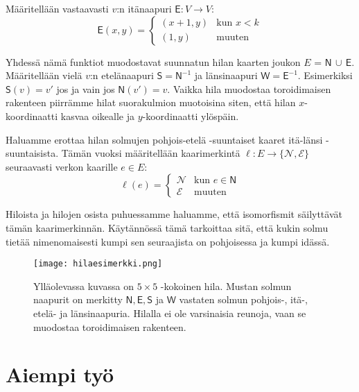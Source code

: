 \documentclass[12pt,finnish]{tktltiki2}
\theoremstyle{definition}
\theoremstyle{remark}
\begin{document}
Määritellään vastaavasti $v$:n itänaapuri $\mathsf{E}: V \rightarrow V$:
\[ \mathsf{E}(x, y) = 
  \begin{cases}
   (x+1, y) & \text{kun } x < k \\
   (1, y) & \text{muuten}
  \end{cases}
\]

Yhdessä nämä funktiot muodostavat suunnatun hilan kaarten joukon $E$ = $\mathsf{N} \, \cup \, \mathsf{E}$. Määritellään vielä $v$:n etelänaapuri $\mathsf{S} = \mathsf{N}^{-1}$ ja länsinaapuri $\mathsf{W} = \mathsf{E}^{-1}$. Esimerkiksi $\mathsf{S}(v) = v'$ jos ja vain jos $\mathsf{N}(v') = v$. Vaikka hila muodostaa toroidimaisen rakenteen piirrämme hilat suorakulmion muotoisina siten, että hilan $x$-koordinaatti kasvaa oikealle ja $y$-koordinaatti ylöspäin.

Haluamme erottaa hilan solmujen pohjois-etelä -suuntaiset kaaret itä-länsi -suuntaisista. Tämän vuoksi määritellään kaarimerkintä $\ell: E \rightarrow \{\mathcal{N}, \mathcal{E}\}$ seuraavasti verkon kaarille $e \in E$:
\[ \ell(e) = 
  \begin{cases}
   \mathcal{N} & \text{kun } e \in \mathsf{N} \\
   \mathcal{E} & \text{muuten}
  \end{cases}
\]

Hiloista ja hilojen osista puhuessamme haluamme, että isomorfismit säilyttävät tämän kaarimerkinnän. Käytännössä tämä tarkoittaa sitä, että kukin solmu tietää nimenomaisesti kumpi sen seuraajista on pohjoisessa ja kumpi idässä.

\begin{figure}
  \centering
  \texttt{[image: hilaesimerkki.png]}
  \caption{Ylläolevassa kuvassa on $5 \times 5$ -kokoinen hila. Mustan solmun naapurit on merkitty $\mathsf{N}, \mathsf{E}, \mathsf{S}$ ja $\mathsf{W}$ vastaten solmun pohjois-, itä-, etelä- ja länsinaapuria. Hilalla ei ole varsinaisia reunoja, vaan se muodostaa toroidimaisen rakenteen. }
\end{figure}


\section{Aiempi työ}
\end{document}
